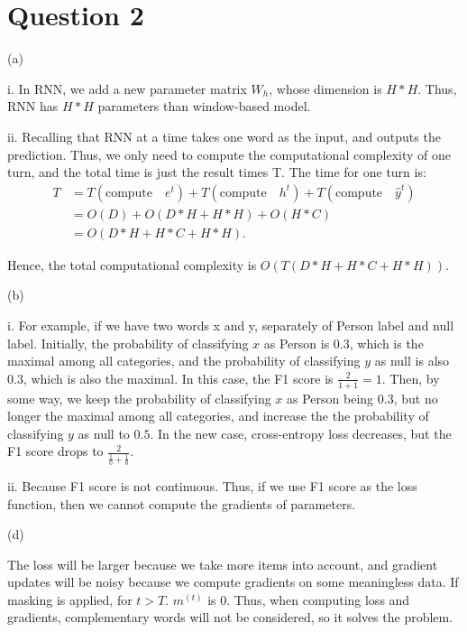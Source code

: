 \documentclass{article}
\theoremstyle{definition}
\theoremstyle{remark}
\numberwithin{equation}{section}
\begin{document}
\newpage

\section*{Question 2}

(a) 

i. In RNN, we add a new parameter matrix $W_h$, whose dimension is $H * H$. Thus, RNN has $H * H$ parameters than window-based model.

\vspace{10pt}

ii. Recalling that RNN at a time takes one word as the input, and outputs the prediction. Thus, we only need to compute the computational complexity of one turn, and the total time is just the result times T. The time for one turn is:
 \begin{align*}
 T &=  T(\text{compute} \quad e^{t})  + T(\text{compute}  \quad h^{t}) +  T(\text{compute}  \quad  \hat{y}^{t}) \\
    &= O(D) + O( D * H + H * H)  +  O(H*C) \\
    &= O ( D * H + H *C + H * H ).
 \end{align*}
 
 
Hence, the total computational complexity is $O ( T  (D * H + H *C + H * H) )$.

\newpage

(b) 

i. For example, if we have two words x and y, separately of Person label and null label. Initially, the probability of classifying $x$ as Person is $0.3$, which is the maximal among all categories, and the probability of classifying $y$ as null is also $0.3$, which is also the maximal. In this case, the F1 score is $\frac{2}{1 + 1} = 1$. Then, by some way, we keep the probability of classifying $x$ as Person being $0.3$, but no longer the maximal among all categories, and increase the the probability of classifying $y$ as null to $0.5$. In the new case, cross-entropy loss decreases, but the F1 score drops to $\frac{2}{\frac{1}{0} + \frac{1}{0}}$. 

\vspace{10pt}

ii. Because F1 score is not continuous. Thus, if we use F1 score as the loss function, then we cannot compute the gradients of parameters.

\newpage


(d)

The loss will be larger because we take more items into account, and gradient updates will be noisy because we compute gradients on some meaningless data. If masking is applied, for $t > T$. $m^{(t)}$ is 0. Thus,  when computing loss and gradients, complementary words will not be considered, so it solves the problem.
 
\end{document}
